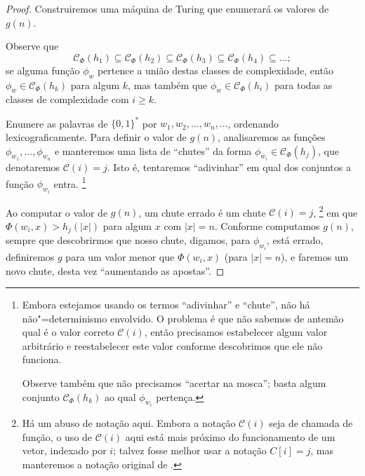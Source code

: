 \begin{proof}
    Construiremos uma máquina de Turing
    que enumerará os valores de $g(n)$.

    Observe que
    \begin{equation*}
        \mathcal C_\Phi(h_1) \subseteq
        \mathcal C_\Phi(h_2) \subseteq
        \mathcal C_\Phi(h_3) \subseteq
        \mathcal C_\Phi(h_4) \subseteq
        \dots;
    \end{equation*}
    se alguma função $\phi_w$ pertence a união destas classes de complexidade,
    então $\phi_w \in \mathcal C_\Phi(h_k)$ para algum $k$,
    mas também que $\phi_w \in \mathcal C_\Phi(h_i)$
    para todas as classes de complexidade com $i \geq k$.

    Enumere as palavras de $\{0, 1\}^*$ por $w_1, w_2, \dots, w_n, \dots$,
    ordenando lexicograficamente.
    Para definir o valor de $g(n)$,
    analisaremos as funções $\phi_{w_1}, \dots, \phi_{w_n}$
    e manteremos uma lista de ``chutes''
    da forma $\phi_{w_i} \in \mathcal C_\Phi(h_j)$,
    que denotaremos $\mathcal C(i) = j$.
    Isto é, tentaremos ``adivinhar''
    em qual dos conjuntos a função $\phi_{w_i}$ entra.%
    \footnote{
        Embora estejamos usando os termos
        ``adivinhar'' e ``chute'',
        não há não"=determinismo envolvido.
        O problema é que não sabemos de antemão
        qual é o valor correto $\mathcal C(i)$,
        então precisamos estabelecer algum valor arbitrário
        e reestabelecer este valor
        conforme descobrimos que ele não funciona.

        Observe também que não precisamos
        ``acertar na mosca'';
        basta algum conjunto $\mathcal C_\Phi(h_k)$
        ao qual $\phi_{w_i}$ pertença.
    }

    Ao computar o valor de $g(n)$,
    um chute errado
    é um chute $\mathcal C(i) = j$,%
    \footnote{
        Há um abuso de notação aqui.
        Embora a notação $\mathcal C(i)$ seja de chamada de função,
        o uso de $\mathcal C(i)$ aqui está mais próximo do funcionamento
        de um vetor, indexado por $i$;
        talvez fosse melhor usar a notação $C[i] = j$,
        mas manteremos a notação original
        de .
    }
    em que $\Phi(w_i, x) > h_j(|x|)$
    para algum $x$ com $|x| = n$.
    Conforme computamos $g(n)$,
    sempre que descobrirmos que nosso chute,
    digamos, para $\phi_{w_i}$, está errado,
    definiremos $g$ para um valor menor que $\Phi(w_i, x)$
    (para $|x| = n$),
    e faremos um novo chute,
    desta vez ``aumentando as apostas''.


\end{proof}
